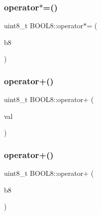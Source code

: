 \hypertarget{struct_b_o_o_l8_abf1644ec601cbaa5b1a8768cb389c909}{}\label{struct_b_o_o_l8_abf1644ec601cbaa5b1a8768cb389c909} 
\subsubsection{\texorpdfstring{operator$\ast$=()}{operator*=()}\hspace{0.1cm}{\footnotesize\ttfamily [2/2]}}
{\footnotesize\ttfamily uint8\+\_\+t B\+O\+O\+L8\+::operator$\ast$= (\begin{DoxyParamCaption}\item[{const \hyperlink{struct_b_o_o_l8}{B\+O\+O\+L8}}]{b8 }\end{DoxyParamCaption})\hspace{0.3cm}{\ttfamily [inline]}}

\hypertarget{struct_b_o_o_l8_aaaa2f1f546b5477c408bc09c646274d2}{}\label{struct_b_o_o_l8_aaaa2f1f546b5477c408bc09c646274d2} 
\subsubsection{\texorpdfstring{operator+()}{operator+()}\hspace{0.1cm}{\footnotesize\ttfamily [1/2]}}
{\footnotesize\ttfamily uint8\+\_\+t B\+O\+O\+L8\+::operator+ (\begin{DoxyParamCaption}\item[{const uint8\+\_\+t}]{val }\end{DoxyParamCaption})\hspace{0.3cm}{\ttfamily [inline]}}

\hypertarget{struct_b_o_o_l8_a75e8ecea46c8e43f6d16f99185114a9a}{}\label{struct_b_o_o_l8_a75e8ecea46c8e43f6d16f99185114a9a} 
\subsubsection{\texorpdfstring{operator+()}{operator+()}\hspace{0.1cm}{\footnotesize\ttfamily [2/2]}}
{\footnotesize\ttfamily uint8\+\_\+t B\+O\+O\+L8\+::operator+ (\begin{DoxyParamCaption}\item[{const \hyperlink{struct_b_o_o_l8}{B\+O\+O\+L8}}]{b8 }\end{DoxyParamCaption})\hspace{0.3cm}{\ttfamily [inline]}}

